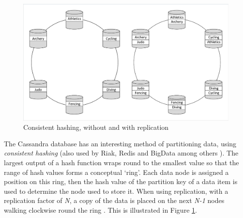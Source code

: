 \begin{figure}
	\label{figure:consistent_hashing}
	\centering
	\includegraphics[trim = 5 5 5 5, clip, width=\textwidth]{img/dbdist}
	\caption{Consistent hashing, without and with replication}
\end{figure}
\FloatBarrier
The Cassandra database has an interesting method of partitioning data, using {\itshape consistent hashing} (also used by Riak, Redis and BigData among others \cite{RN66}).  The largest output of a hash function wraps round to the smallest value so that the range of hash values forms a conceptual `ring'.  Each data node is assigned a position on this ring, then the hash value of the partition key of a data item is used to determine the node used to store it.  When using replication, with a replication factor of {\itshape N}, a copy of the data is placed on the next {\itshape N-1} nodes walking clockwise round the ring \cite{RN1050}.  This is illustrated in Figure \ref{figure:consistent_hashing}.

